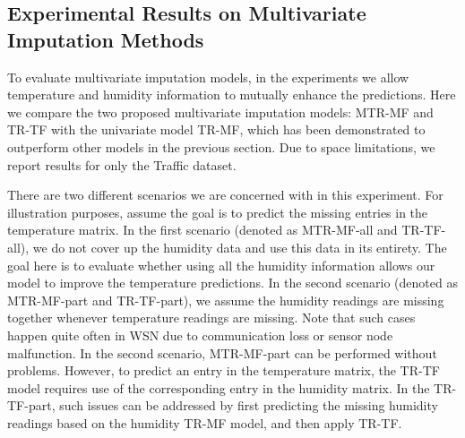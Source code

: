 \subsection{Experimental Results on Multivariate Imputation Methods}




To evaluate multivariate imputation models, in the experiments we allow temperature and humidity information to mutually enhance the predictions.
Here we compare the two proposed multivariate imputation models: MTR-MF and TR-TF with the univariate model TR-MF, which has been demonstrated to outperform other models in the previous section. 
Due to space limitations, we report results for only the Traffic dataset.

There are two different scenarios we are concerned with in this experiment.
For illustration purposes, assume the goal is to predict the missing entries in the temperature matrix.
In the first scenario (denoted as MTR-MF-all and TR-TF-all), we do not cover up the humidity data and use this data in its entirety.
The goal here is to evaluate whether using all the humidity information allows our model to improve the temperature predictions.
In the second scenario (denoted as MTR-MF-part and TR-TF-part), we assume the humidity readings are missing together whenever temperature readings are missing.
Note that such cases happen quite often in WSN due to communication loss or sensor node malfunction.
In the second scenario, MTR-MF-part can be performed without problems.
However, to predict an entry in the temperature matrix, the TR-TF model requires use of the corresponding entry in the humidity matrix.
In the TR-TF-part, such issues can be addressed by first predicting the missing humidity readings based on the humidity TR-MF model, and then apply TR-TF.

